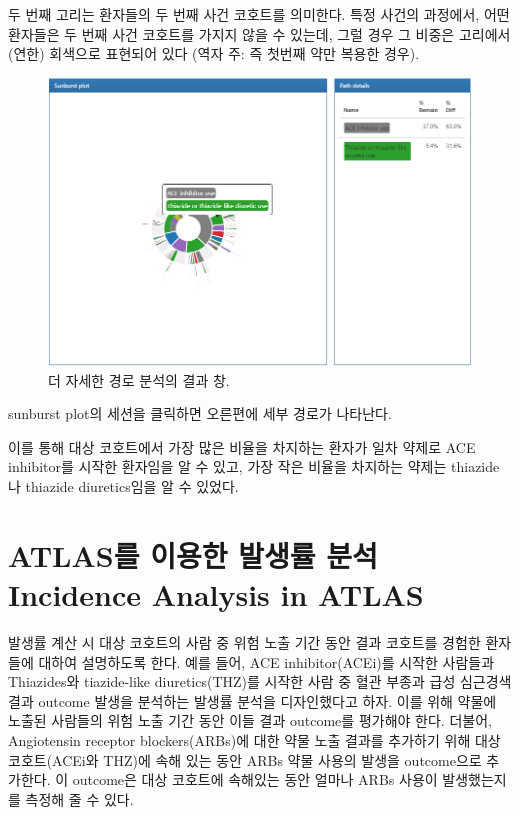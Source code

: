 \documentclass[11pt]{book}
\theoremstyle{definition}
\theoremstyle{definition}
\theoremstyle{definition}
\theoremstyle{remark}
\begin{document}
두 번째 고리는 환자들의 두 번째 사건 코호트를 의미한다. 특정 사건의
과정에서, 어떤 환자들은 두 번째 사건 코호트를 가지지 않을 수 있는데,
그럴 경우 그 비중은 고리에서 (연한) 회색으로 표현되어 있다 (역자 주: 즉
첫번째 약만 복용한 경우).

\begin{figure}

{\centering \includegraphics[width=1\linewidth]{images/Characterization/atlasPathwaysResultsPathDetails} 

}

\caption{더 자세한 경로 분석의 결과 창.}\label{fig:atlasPathwaysResultsPathDetails}
\end{figure}

sunburst plot의 세션을 클릭하면 오른편에 세부 경로가 나타난다.

이를 통해 대상 코호트에서 가장 많은 비율을 차지하는 환자가 일차 약제로
ACE inhibitor를 시작한 환자임을 알 수 있고, 가장 작은 비율을 차지하는
약제는 thiazide나 thiazide diuretics임을 알 수 있었다.

\section{ATLAS를 이용한 발생률 분석 Incidence Analysis in
ATLAS}\label{atlas----incidence-analysis-in-atlas}

발생률 계산 시 대상 코호트의 사람 중 위험 노출 기간 동안 결과 코호트를
경험한 환자들에 대하여 설명하도록 한다. 예를 들어, ACE inhibitor(ACEi)를
시작한 사람들과 Thiazides와 tiazide-like diuretics(THZ)를 시작한 사람 중
혈관 부종과 급성 심근경색 결과 outcome 발생을 분석하는 발생률 분석을
디자인했다고 하자. 이를 위해 약물에 노출된 사람들의 위험 노출 기간 동안
이들 결과 outcome를 평가해야 한다. 더불어, Angiotensin receptor
blockers(ARBs)에 대한 약물 노출 결과를 추가하기 위해 대상 코호트(ACEi와
THZ)에 속해 있는 동안 ARBs 약물 사용의 발생을 outcome으로 추가한다. 이
outcome은 대상 코호트에 속해있는 동안 얼마나 ARBs 사용이 발생했는지를
측정해 줄 수 있다.
\end{document}
